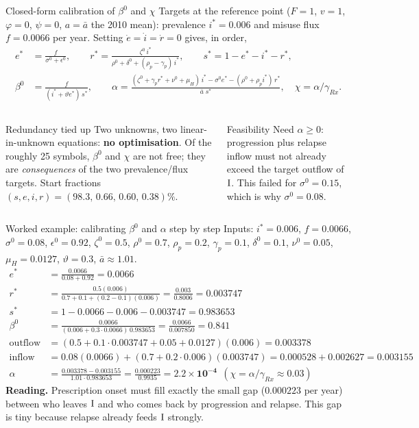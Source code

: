 ﻿\documentclass[9pt,aspectratio=169]{beamer}
\newenvironment{tied}{\begin{alertblock}{Redundancy tied up}\small}{\end{alertblock}}
\begin{document}
\begin{frame}{Closed-form calibration of $\beta^0$ and $\chi$}
 Targets at the reference point ($F=1$, $v=1$, $\varphi=0$, $\psi=0$, $a=\bar a$ the 2010 mean): prevalence $i^\ast=0.006$ and misuse flux $f=0.0066$ per year.
 Setting $\dot e=\dot i=\dot r=0$ gives, in order,
 \begin{align*}
  e^\ast&=\frac{f}{\sigma^0+\epsilon^0},\qquad
  r^\ast=\frac{\zeta^0\,i^\ast}{\rho^0+\delta^0+(\rho_p-\gamma_p)\,i^\ast},\qquad s^\ast=1-e^\ast-i^\ast-r^\ast,\\
  \beta^0&=\frac{f}{(i^\ast+\vartheta e^\ast)\,s^\ast},\qquad
  \alpha=\frac{(\zeta^0+\gamma_pr^\ast+\nu^0+\mu_H)\,i^\ast-\sigma^0e^\ast-(\rho^0+\rho_pi^\ast)\,r^\ast}{\bar a\;s^\ast},\quad \chi=\alpha/\gamma_{Rx}.
 \end{align*}
 \begin{columns}[T]
 \begin{tied}
  Two unknowns, two linear-in-unknown equations: \textbf{no optimisation}. Of the roughly 25 symbols, $\beta^0$ and $\chi$ are not free; they are \emph{consequences} of the two prevalence/flux targets. Start fractions $(s,e,i,r)=(98.3,\,0.66,\,0.60,\,0.38)\%$.
 \end{tied}
 \begin{block}{Feasibility}\small
  Need $\alpha\ge0$: progression plus relapse inflow must not already exceed the target outflow of $\mathrm{I}$. This failed for $\sigma^0=0.15$, which is why $\sigma^0=0.08$.
 \end{block}
 \end{columns}
\end{frame}


\begin{frame}{Worked example: calibrating $\beta^0$ and $\alpha$ step by step}
 Inputs: $i^\ast=0.006$, $f=0.0066$, $\sigma^0=0.08$, $\epsilon^0=0.92$, $\zeta^0=0.5$, $\rho^0=0.7$, $\rho_p=0.2$, $\gamma_p=0.1$, $\delta^0=0.1$, $\nu^0=0.05$, $\mu_H=0.0127$, $\vartheta=0.3$, $\bar a\approx1.01$.
 \footnotesize
 \begin{align*}
  e^\ast&=\frac{0.0066}{0.08+0.92}=0.0066\\
  r^\ast&=\frac{0.5(0.006)}{0.7+0.1+(0.2-0.1)(0.006)}=\frac{0.003}{0.8006}=0.003747\\
  s^\ast&=1-0.0066-0.006-0.003747=0.983653\\
  \beta^0&=\frac{0.0066}{(0.006+0.3\cdot0.0066)\,0.983653}=\frac{0.0066}{0.007850}=\mathbf{0.841}\\
  \text{outflow of I}&=(0.5+0.1\cdot0.003747+0.05+0.0127)(0.006)=0.003378\\
  \text{inflow to I from E, R}&=0.08(0.0066)+(0.7+0.2\cdot0.006)(0.003747)=0.000528+0.002627=0.003155\\
  \alpha&=\frac{0.003378-0.003155}{1.01\cdot0.983653}=\frac{0.000223}{0.9935}=\mathbf{2.2\times10^{-4}}\ \ (\chi=\alpha/\gamma_{Rx}\approx0.03)
 \end{align*}
 \normalsize
 \textbf{Reading.} Prescription onset must fill exactly the small gap ($0.000223$ per year) between who leaves $\mathrm{I}$ and who comes back by progression and relapse. This gap is tiny because relapse already feeds $\mathrm{I}$ strongly.
\end{frame}
\end{document}
